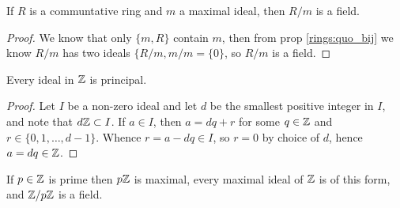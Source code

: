   \begin{prop}
    If $R$ is a communtative ring and $m$ a maximal ideal, then $R/m$ is a
    field.
  \end{prop}

  \begin{proof}
    We know that only $\{m,R\}$ contain $m$, then from prop
    \ref{rings:quo_bij} we know $R/m$ has two ideals $\{R/m, m/m = \{0\}$,
    so $R/m$ is a field.
  \end{proof}

  \begin{lemma}
    Every ideal in $\mathbb{Z}$ is principal.
  \end{lemma}

  \begin{proof}
    Let $I$ be a non-zero ideal and let $d$ be the smallest positive integer
    in $I$, and note that $d\mathbb{Z} \subset I$. If $a \in I$, then $a = dq + r$
    for some $q \in \mathbb{Z}$ and $r \in \{0, 1, \ldots, d-1\}$. Whence
    $r = a-dq \in I$, so $r = 0$ by choice of $d$, hence $a = dq \in \mathbb{Z}$.
  \end{proof}

  \begin{prop}
    If $p\in \mathbb{Z}$ is prime then $p\mathbb{Z}$ is maximal, every maximal ideal of $\mathbb{Z}$
    is of this form, and $\mathbb{Z}/p\mathbb{Z}$ is a field.
  \end{prop}
